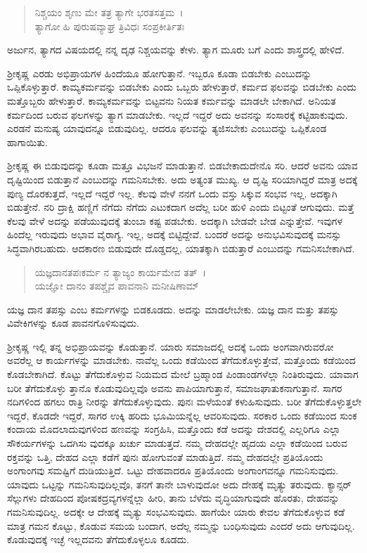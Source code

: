 \begin{verse}
ನಿಶ್ಚಯಂ ಶೃಣು ಮೇ ತತ್ರ ತ್ಯಾಗೇ ಭರತಸತ್ತಮ~।\\ತ್ಯಾಗೋ ಹಿ ಪುರುಷವ್ಯಾಘ್ರ ತ್ರಿವಿಧಃ ಸಂಪ್ರಕೀರ್ತಿತಃ 
\end{verse}

{\small ಅರ್ಜುನ, ತ್ಯಾಗದ ವಿಷಯದಲ್ಲಿ ನನ್ನ ದೃಢ ನಿಶ್ಚಯವನ್ನು ಕೇಳು. ತ್ಯಾಗ ಮೂರು ಬಗೆ ಎಂದು ಶಾಸ್ತ್ರದಲ್ಲಿ ಹೇಳಿದೆ.}

ಶ‍್ರೀಕೃಷ್ಣ ಎರಡು ಅಭಿಪ್ರಾಯಗಳ ಹಿಂದೆಯೂ ಹೋಗುತ್ತಾನೆ. ಇಬ್ಬರೂ ಕೂಡಾ ಬಿಡಬೇಕು ಎಂಬುದನ್ನು ಒಪ್ಪಿಕೊಳ್ಳುತ್ತಾರೆ. ಕಾಮ್ಯಕರ್ಮವನ್ನು ಬಿಡಬೇಕು ಎಂದು ಒಬ್ಬರು ಹೇಳುತ್ತಾರೆ, ಕರ್ಮದ ಫಲವನ್ನು ಬಿಡಬೇಕು ಎಂದು ಮತ್ತೊಬ್ಬರು ಹೇಳುತ್ತಾರೆ. ಕಾಮ್ಯಕರ್ಮವನ್ನು ಬಿಟ್ಟವನು ನಿಯತ ಕರ್ಮವನ್ನು ಮಾಡಲೇ ಬೇಕಾಗಿದೆ. ಅನಿಯತ ಕರ್ಮದಿಂದ ಬರುವ ಫಲಗಳನ್ನು ತ್ಯಾಗ ಮಾಡಬೇಕು. ಇಲ್ಲದೆ ಇದ್ದರೆ ಅದು ಅವನನ್ನು ಸಂಸಾರಕ್ಕೆ ಕಟ್ಟಿಹಾಕುವುದು. ಎರಡನೆ ಮನುಷ್ಯ ಯಾವುದನ್ನೂ ಬಿಡುವುದಿಲ್ಲ. ಆದರೂ ಫಲವನ್ನು ತ್ಯಜಿಸಬೇಕು ಎಂಬುದನ್ನು ಒಪ್ಪಿಕೊಂಡ ಹಾಗಾಯಿತು.

ಶ‍್ರೀಕೃಷ್ಣ ಈ ಬಿಡುವುದನ್ನು ಕೂಡಾ ಮತ್ತೂ ವಿಭಜನೆ ಮಾಡುತ್ತಾನೆ. ಬಿಡಬೇಕಾದುದೇನೊ ಸರಿ. ಆದರೆ ಅವನು ಯಾವ ದೃಷ್ಟಿಯಿಂದ ಬಿಡುತ್ತಾನೆ ಎಂಬುದನ್ನು ಗಮನಿಸಬೇಕು. ಅದು ಅತ್ಯಂತ ಮುಖ್ಯ. ಆ ದೃಷ್ಟಿ ಸರಿಯಾಗಿದ್ದರೆ ಮಾತ್ರ ಅದಕ್ಕೆ ಪುಣ್ಯ ದೊರಕುತ್ತದೆ, ಇಲ್ಲದೆ ಇದ್ದರೆ ಇಲ್ಲ. ಕೆಲವು ವೇಳೆ ನನಗೆ ಒಂದು ವಸ್ತು ಸಿಕ್ಕುವ ಸಂಭವ ಇಲ್ಲ. ಅದಕ್ಕಾಗಿ ಬಿಡುತ್ತೇನೆ. ನರಿ ದ್ರಾಕ್ಷಿ ಹಣ್ಣಿಗೆ ನೆಗೆದು ನೆಗೆದು ಎಟುಕದಾಗ ಅದೆಲ್ಲ ಬರೀ ಹುಳಿ ಎಂದು ಬಿಟ್ಟಂತೆ ಆಗುವುದು. ಮತ್ತೆ ಕೆಲವು ವೇಳೆ ಅದನ್ನು ಪಡೆಯುವುದಕ್ಕೆ ತುಂಬಾ ಕಷ್ಟ ಪಡಬೇಕು. ಅದಕ್ಕಾಗಿ ಬೇಡವೇ ಬೇಡ ಎನ್ನುತ್ತೇವೆ. ಇವುಗಳ ಹಿಂದೆಲ್ಲ ಇರುವುದು ಅಭಾವ ವೈರಾಗ್ಯ. ಇಲ್ಲ, ಅದಕ್ಕೆ ಬಿಟ್ಟಿದ್ದೇವೆ. ಬಂದರೆ ಅದನ್ನು ಅನುಭವಿಸುವುದಕ್ಕೆ ಮನಸ್ಸು ಸಿದ್ಧವಾಗಿರಬಹುದು. ಆದಕಾರಣ ಬಿಡುವುದೇ ದೊಡ್ಡದಲ್ಲ, ಯಾತಕ್ಕಾಗಿ ಬಿಡುತ್ತಾರೆ ಎಂಬುದನ್ನು ಗಮನಿಸಬೇಕಾಗಿದೆ.

\begin{verse}
ಯಜ್ಞದಾನತಪಃಕರ್ಮ ನ ತ್ಯಾಜ್ಯಂ ಕಾರ್ಯಮೇವ ತತ್~।\\ಯಜ್ಞೋ ದಾನಂ ತಪಶ್ಚೈವ ಪಾವನಾನಿ ಮನೀಷಿಣಾಮ್ 
\end{verse}

{\small ಯಜ್ಞ ದಾನ ತಪಸ್ಸು ಎಂಬ ಕರ್ಮಗಳನ್ನು ಬಿಡಕೂಡದು. ಅದನ್ನು ಮಾಡಲೇಬೇಕು. ಯಜ್ಞ ದಾನ ಮತ್ತು ತಪಸ್ಸು ವಿವೇಕಿಗಳನ್ನು ಕೂಡ ಪಾವನಗೊಳಿಸುವುದು.}

ಶ‍್ರೀಕೃಷ್ಣ ಇಲ್ಲಿ ತನ್ನ ಅಭಿಪ್ರಾಯವನ್ನು ಕೊಡುತ್ತಾನೆ. ಯಾರು ಸಮಾಜದಲ್ಲಿ ಅದಕ್ಕೆ ಒಂದು ಅಂಗವಾಗಿರುವರೋ ಅವರೆಲ್ಲ ಆ ಕಾರ್ಯಗಳನ್ನು ಮಾಡಬೇಕು. ನಾವೆಲ್ಲ ಒಂದು ಕಡೆಯಿಂದ ತೆಗೆದುಕೊಳ್ಳುತ್ತೇವೆ, ಮತ್ತೊಂದು ಕಡೆಯಿಂದ ಕೊಡಬೇಕಾಗಿದೆ. ಕೊಟ್ಟು ತೆಗೆದುಕೊಳ್ಳುವ ನಿಯಮದ ಮೇಲೆ ಬ್ರಹ್ಮಾಂಡ ಪಿಂಡಾಂಡಗಳೆಲ್ಲಾ ನಿಂತಿರುವುದು. ಯಾವಾಗ ಬರೀ ತೆಗೆದುಕೊಳ್ಳು ತ್ತಾನೊ ಕೊಡುವುದಿಲ್ಲವೊ ಅವನು ಪಾಪಿಯಾಗುತ್ತಾನೆ, ಸಮಾಜಘಾತುಕನಾಗುತ್ತಾನೆ. ಸಾಗರ ನದಿಗಳಿಂದ ಹಗಲು ರಾತ್ರಿ ನೀರನ್ನು ತೆಗೆದುಕೊಳ್ಳುವುದು. ಪುನಃ ಮಳೆಯಂತೆ ಕಳುಹಿಸುವುದು. ಬರೀ ತೆಗೆದುಕೊಳ್ಳುತ್ತಲೇ ಇದ್ದರೆ, ಕೊಡದೇ ಇದ್ದರೆ, ಸಾಗರ ಉಕ್ಕಿ ಹರಿದು ಭೂಮಿಯನ್ನೆಲ್ಲ ಆವರಿಸುವುದು. ಸರಕಾರ ಒಂದು ಕಡೆಯಿಂದ ಸುಂಕ ಕಂದಾಯ ಮೊದಲಾದುವುಗಳಿಂದ ಹಣವನ್ನು ಸಂಗ್ರಹಿಸಿ, ಮತ್ತೊಂದು ಕಡೆ ಅದನ್ನು ದೇಶದಲ್ಲಿ ಎಲ್ಲರಿಗೂ ಎಲ್ಲಾ ಸೌಕರ್ಯಗಳನ್ನು ಒದಗಿಸು ವುದಕ್ಕೂ ಖರ್ಚು ಮಾಡುತ್ತದೆ. ನಮ್ಮ ದೇಹದಲ್ಲೇ ಹೃದಯ ಎಲ್ಲಾ ಕಡೆಯಿಂದ ಬರುವ ರಕ್ತವನ್ನು ಒತ್ತಿ, ದೇಹದ ಎಲ್ಲಾ ಕಡೆಗೆ ಪುನಃ ಹೋಗುವಂತೆ ಮಾಡುತ್ತಿದೆ. ನಮ್ಮ ದೇಹದಲ್ಲೇ ಪ್ರತಿಯೊಂದು ಅಂಗಾಂಗವು ಸಮಷ್ಟಿಗೆ ದುಡಿಯುತ್ತಿದೆ. ಒಟ್ಟು ದೇಹವಾದರೂ ಪ್ರತಿಯೊಂದು ಅಂಗಾಂಗವನ್ನೂ ಗಮನಿಸುವುದು. ಯಾವುದು ಒಟ್ಟನ್ನು ಗಮನಿಸುವುದಿಲ್ಲವೊ, ತನಗೆ ತಾನೇ ಬಾಳುವುದೋ ಅದು ದೇಹಕ್ಕೆ ಮೃತ್ಯು ತರುವುದು. ಕ್ಯಾನ್ಸರ್ ಸೆಲ್ಲುಗಳು ದೇಹದಿಂದ ಪೋಷಕದ್ರವ್ಯಗಳನ್ನೆಲ್ಲಾ ಹೀರಿ, ತಾನು ಬೆಳೆದು ವೃದ್ಧಿಯಾಗುವುದೇ ಹೊರತು, ದೇಹವನ್ನು ಗಮನಿಸುವುದಿಲ್ಲ. ಅದಕ್ಕೇ ಆ ದೇಹಕ್ಕೆ ಮೃತ್ಯು ಸಂಭವಿಸುವುದು. ಹಾಗೆಯೇ ಯಾರು ಕೇವಲ ತೆಗೆದುಕೊಳ್ಳುವ ಕಡೆ ಮಾತ್ರ ಗಮನ ಕೊಟ್ಟು, ಕೊಡುವ ಸಮಯ ಬಂದಾಗ, ಅದೆಲ್ಲ ನಮ್ಮನ್ನು ಬಂಧಿಸುವುದು ಎಂದರೆ ಅದು ಆಗುವುದಿಲ್ಲ. ಕೊಡುವುದಕ್ಕೆ ಇಚ್ಛೆ ಇಲ್ಲದವನು ತೆಗೆದುಕೊಳ್ಳಲೂ ಕೂಡದು.

